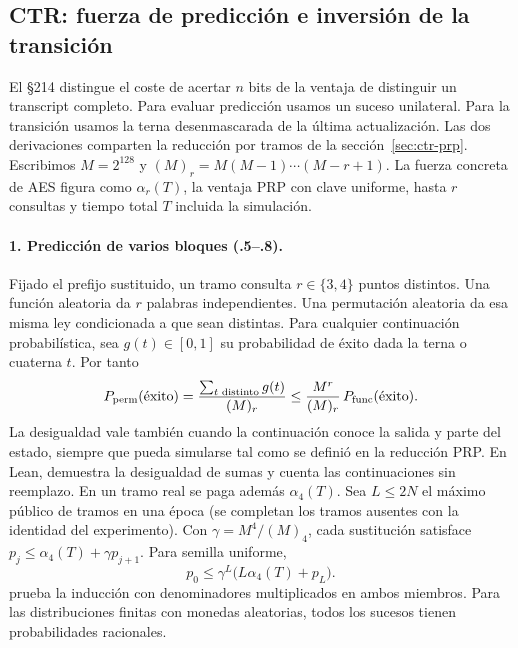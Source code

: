 \subsection{CTR: fuerza de predicción e inversión de la transición}
\label{sec:ctr-finite-reductions}
El §214 distingue el coste de acertar \(n\) bits de la ventaja de distinguir
un transcript completo. Para evaluar predicción usamos un suceso unilateral.
Para la transición usamos la terna desenmascarada de la última actualización.
Las dos derivaciones comparten la reducción por tramos de
la sección~\ref{sec:ctr-prp}. Escribimos \(M=2^{128}\) y
\((M)_r=M(M-1)\cdots(M-r+1)\). La fuerza concreta de AES figura como
\(\alpha_r(T)\), la ventaja PRP con clave uniforme, hasta \(r\)
consultas y tiempo total \(T\) incluida la simulación.

\paragraph{1. Predicción de varios bloques (.5--.8).}
Fijado el prefijo sustituido, un tramo consulta \(r\in\{3,4\}\)
puntos distintos. Una función aleatoria da \(r\) palabras independientes.
Una permutación aleatoria da esa misma ley condicionada a que sean distintas.
Para cualquier continuación probabilística, sea \(g(t)\in[0,1]\)
su probabilidad de éxito dada la terna o cuaterna \(t\). Por tanto
\[
 P_{\rm perm}(\text{éxito})
 =\frac{\sum_{t\text{ distinto}} g(t)}{(M)_r}
 \le \frac{M^r}{(M)_r}\,P_{\rm func}(\text{éxito}).
\]
La desigualdad vale también cuando la continuación conoce la salida y
parte del estado, siempre que pueda simularse tal como se definió en
la reducción PRP. En Lean,  demuestra la
desigualdad de sumas y  cuenta las continuaciones
sin reemplazo. En un tramo real se paga además \(\alpha_4(T)\).
Sea \(L\le2N\) el máximo público de tramos en una época (se completan
los tramos ausentes con la identidad del experimento). Con
\(\gamma=M^4/(M)_4\), cada sustitución satisface
\(p_j\le\alpha_4(T)+\gamma p_{j+1}\). Para semilla uniforme,
\[
 p_0\le \gamma^L\bigl(L\alpha_4(T)+p_L\bigr).
\]
 prueba la inducción con denominadores
multiplicados en ambos miembros. Para las distribuciones finitas con monedas
aleatorias, todos los sucesos tienen probabilidades racionales.

